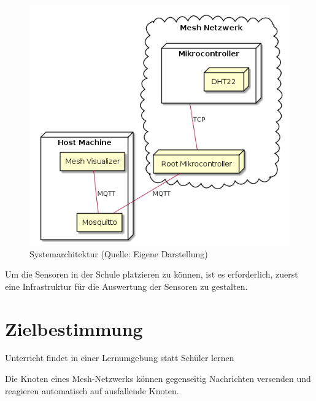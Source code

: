 \begin{figure}[H]
    \centering
    \includegraphics[scale=0.8]{diagrams/deployment.png}
    \caption{Systemarchitektur (Quelle: Eigene Darstellung)}
    \label{abb:deployment}
\end{figure}

Um die Sensoren in der Schule platzieren zu können, ist es erforderlich, zuerst eine Infrastruktur für die Auswertung der Sensoren zu gestalten.

\section{Zielbestimmung}
Unterricht findet in einer Lernumgebung statt
Schüler lernen

Die Knoten eines Mesh-Netzwerks können gegenseitig Nachrichten versenden und reagieren automatisch auf ausfallende Knoten.